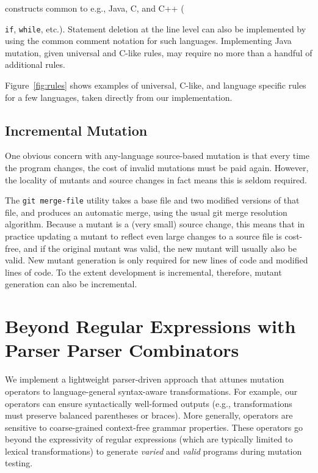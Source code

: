 \documentclass[sigconf,review, anonymous]{acmart}
\begin{document}
constructs common to e.g.,  Java, C, and C++ ({{\tt if}, {\tt while},
  etc.).  Statement deletion at the line level can also be implemented
  by using the common comment notation for such languages.
  Implementing Java mutation, given universal and C-like rules, may
  require no more than a handful of additional rules.

  Figure~\ref{fig:rules} shows examples of universal, C-like, and
  language specific rules for a few languages, taken directly from our
  implementation.  


\subsection{Incremental Mutation}

One obvious concern with any-language source-based mutation is that every time the
program changes, the cost of invalid mutations must be paid again.
However, the locality of mutants and source changes in fact means this
is seldom required.

The {\tt git merge-file} utility takes a base file and two modified
versions of that file, and produces an automatic merge, using the
usual git merge resolution algorithm.    Because a mutant is a (very
small) source change, this means that in practice updating a mutant to
reflect even large changes to a source file is cost-free, and if the
original mutant was valid, the new mutant will usually also be valid.
New mutant generation is only required for new lines of code and
modified lines of code.  To the extent development is incremental,
therefore, mutant generation can also be incremental.

\section{Beyond Regular Expressions with Parser Parser Combinators}

We implement a lightweight parser-driven approach that attunes mutation
operators to language-general syntax-aware transformations. For example, our
operators can ensure syntactically well-formed outputs (e.g., transformations
must preserve balanced parentheses or braces). More generally, operators are
sensitive to coarse-grained context-free grammar properties. These operators go
beyond the expressivity of regular expressions (which are typically limited to
lexical transformations) to generate \emph{varied} and \emph{valid}
programs during mutation testing.

}
\end{document}
